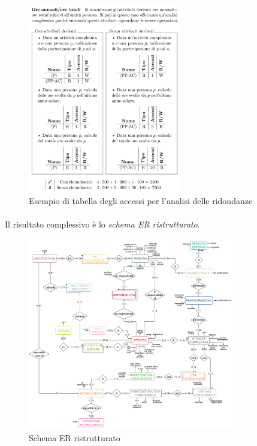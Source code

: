 \documentclass[11pt,a4paper,english]{article}
\begin{document}
\begin{figure}[H]
    \centering
    \includegraphics[width=0.6\textwidth]{img/tabella_accessi.png}
    \caption{Esempio di tabella degli accessi per l'analisi delle ridondanze}
\end{figure}

\paragraph{} Il risultato complessivo è lo \emph{schema ER ristrutturato}.

\begin{figure}[H]
    \centering
    \includegraphics[width=0.8\textwidth]{img/er-ristrutturato.png}
    \caption{Schema ER ristrutturato}
\end{figure}
\end{document}
